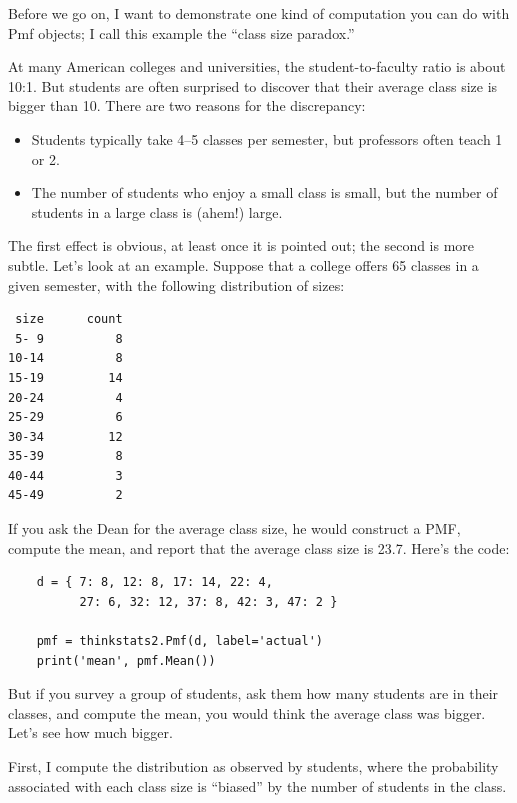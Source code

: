 \documentclass[12pt]{book}
\theoremstyle{exercise}
\begin{document}
Before we go on, I want to demonstrate
one kind of computation you can do with Pmf objects; I call
this example the ``class size paradox.''%

At many American colleges and universities, the student-to-faculty
ratio is about 10:1.  But students are often surprised to discover
that their average class size is bigger than 10.  There
are two reasons for the discrepancy:

\begin{itemize}

\item Students typically take 4--5 classes per semester, but
professors often teach 1 or 2.

\item The number of students who enjoy a small class is small,
but the number of students in a large class is (ahem!) large.

\end{itemize}

The first effect is obvious, at least once it is pointed out;
the second is more subtle.  Let's look at an example.  Suppose
that a college offers 65 classes in a given semester, with the
following distribution of sizes:
%
\begin{verbatim}
 size      count
 5- 9          8
10-14          8
15-19         14
20-24          4
25-29          6
30-34         12
35-39          8
40-44          3
45-49          2
\end{verbatim}

If you ask the Dean for the average class size, he would
construct a PMF, compute the mean, and report that the
average class size is 23.7.  Here's the code:

\begin{verbatim}
    d = { 7: 8, 12: 8, 17: 14, 22: 4, 
          27: 6, 32: 12, 37: 8, 42: 3, 47: 2 }

    pmf = thinkstats2.Pmf(d, label='actual')
    print('mean', pmf.Mean())
\end{verbatim}

But if you survey a group of students, ask them how many
students are in their classes, and compute the mean, you would
think the average class was bigger.  Let's see how
much bigger.

First, I compute the
distribution as observed by students, where the probability
associated with each class size is ``biased'' by the number
of students in the class.%
%
\end{document}

